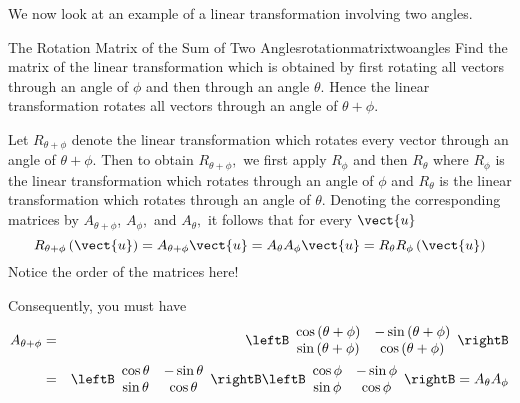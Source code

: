 We now look at an example of a linear transformation involving two angles.

\begin{example}{The Rotation Matrix of the Sum of Two Angles}{rotationmatrixtwoangles}
Find the matrix of the linear transformation which is
obtained by first rotating all vectors through an angle of $\phi $ and then
through an angle $\theta .$ Hence the linear transformation 
rotates all vectors through an angle of $\theta +\phi .$
\end{example}

\begin{solution}
Let $R_{\theta +\phi }$ denote the linear transformation which rotates every
vector through an angle of $\theta +\phi .$ 
Then to obtain $R_{\theta +\phi },$
we first apply $R_{\phi }$ and then $R_{\theta }$ where $R_{\phi }$
is the linear transformation which rotates through an angle of $\phi $ and 
$R_{\theta }$ is the linear transformation which rotates through an angle of 
$\theta $. Denoting the corresponding matrices by $A_{\theta +\phi }$, 
$A_{\phi },$ and $A_{\theta },$ it follows that for every $\vect{u}$
\begin{equation*}
R_{\theta +\phi }\left(\vect{u}\right)=A_{\theta +\phi }\vect{u}=A_{\theta }A_{\phi }\vect{u} = R_{\theta }R_{\phi }
\left(\vect{u}\right)
\end{equation*}
Notice the order of the matrices here! 

Consequently, you must have
\begin{eqnarray*}
A_{\theta +\phi } &=&\leftB
\begin{array}{cc}
\cos \left( \theta +\phi \right) & -\sin \left( \theta +\phi \right) \\
\sin \left( \theta +\phi \right) & \cos \left( \theta +\phi \right)
\end{array}
\rightB\\
&=&\leftB
\begin{array}{cc}
\cos \theta & -\sin \theta \\
\sin \theta & \cos \theta
\end{array}
\rightB \leftB
\begin{array}{cc}
\cos \phi & -\sin \phi \\
\sin \phi & \cos \phi
\end{array}
\rightB 
 =A_{\theta }A_{\phi } 
\end{eqnarray*}


\end{solution}
